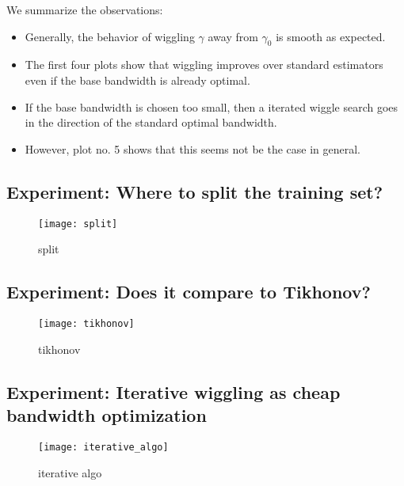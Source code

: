 \documentclass[12pt]{amsart}
\begin{document}
We summarize the observations:
\begin{itemize}
    \item Generally, the behavior of wiggling $\gamma$ away from $\gamma_0$
        is smooth as expected.
    \item The first four plots show that wiggling improves over standard
        estimators even if the base bandwidth is already optimal.
    \item If the base bandwidth is chosen too small, then a iterated 
        wiggle search goes in the direction of the standard optimal bandwidth.
    \item However, plot no. 5 shows that this seems not be the case in general.
\end{itemize}

\subsection{Experiment: Where to split the training set?}

\begin{figure}[htp]
    \centering
    \texttt{[image: split]}
    \caption{split}
    \label{fig:split}
\end{figure}

\subsection{Experiment: Does it compare to Tikhonov?}

\begin{figure}[htp]
    \centering
    \texttt{[image: tikhonov]}
    \caption{tikhonov}
    \label{fig:tikhonov}
\end{figure}

\subsection{Experiment: Iterative wiggling as cheap bandwidth optimization}

\begin{figure}[htp]
    \centering
    \texttt{[image: iterative\_algo]}
    \caption{iterative algo}
    \label{fig:iterative_algo}
\end{figure}
\end{document}
